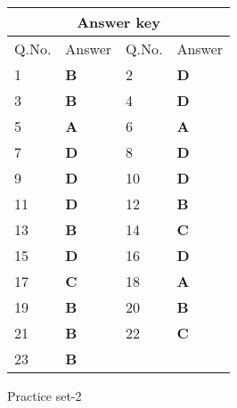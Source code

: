 \begin{table}[H]
	\centering
	\begin{tabular}{|p{1.5cm}|p{1.5cm}||p{1.5cm}|p{1.5cm}|}
		\hline
		\multicolumn{4}{|c|}{\textbf{Answer key}}\\\hline\hline
		\rowcolor{ocrel}Q.No.&Answer&Q.No.&Answer\\\hline
		1&\textbf{B} &2&\textbf{D}\\\hline 
		3&\textbf{B} &4&\textbf{D} \\\hline
		5&\textbf{A} &6&\textbf{A} \\\hline
		7&\textbf{D}&8&\textbf{D}\\\hline
		9&\textbf{D}&10&\textbf{D}\\\hline
		11&\textbf{D} &12&\textbf{B}\\\hline
		13&\textbf{B}&14&\textbf{C}\\\hline
		15&\textbf{D}&16&\textbf{D} \\\hline
		17&\textbf{C}&18&\textbf{A}\\\hline
		19&\textbf{B}&20&\textbf{B}\\\hline
		21&\textbf{B} &22&\textbf{C}\\\hline
		23&\textbf{B}&&\textbf{}\\\hline
	\end{tabular}
\end{table}
\newpage
\begin{abox}
	Practice set-2
\end{abox}
